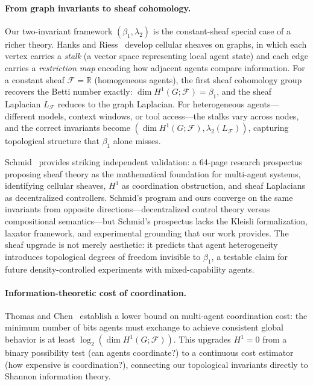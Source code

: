 \paragraph{From graph invariants to sheaf cohomology.}
Our two-invariant framework $(\beta_1, \lambda_2)$ is the
constant-sheaf special case of a richer theory.
Hanks and Riess~\cite{hanks2025cellular} develop cellular sheaves on
graphs, in which each vertex carries a \emph{stalk} (a vector space
representing local agent state) and each edge carries a
\emph{restriction map} encoding how adjacent agents compare information.
For a constant sheaf $\mathcal{F} = \mathbb{R}$ (homogeneous agents),
the first sheaf cohomology group recovers the Betti number exactly:
$\dim H^1(G;\mathcal{F}) = \beta_1$, and the sheaf Laplacian
$L_{\mathcal{F}}$ reduces to the graph Laplacian.
For heterogeneous agents---different models, context windows, or tool
access---the stalks vary across nodes, and the correct invariants
become $(\dim H^1(G;\mathcal{F}), \lambda_2(L_{\mathcal{F}}))$,
capturing topological structure that $\beta_1$ alone misses.

Schmid~\cite{schmid2026prospectus} provides striking independent
validation: a 64-page research prospectus proposing sheaf theory as the
mathematical foundation for multi-agent systems, identifying cellular
sheaves, $H^1$ as coordination obstruction, and sheaf Laplacians as
decentralized controllers.
Schmid's program and ours converge on the same invariants from opposite
directions---decentralized control theory versus compositional
semantics---but Schmid's prospectus lacks the Kleisli formalization,
laxator framework, and experimental grounding that our work provides.
The sheaf upgrade is not merely aesthetic: it predicts that agent
heterogeneity introduces topological degrees of freedom invisible to
$\beta_1$, a testable claim for future density-controlled experiments
with mixed-capability agents.



\paragraph{Information-theoretic cost of coordination.}
Thomas and Chen~\cite{thomas2026shannon} establish a lower bound on
multi-agent coordination cost: the minimum number of bits agents must
exchange to achieve consistent global behavior is at least
$\log_2(\dim H^1(G;\mathcal{F}))$.
This upgrades $H^1 = 0$ from a binary possibility test (can agents
coordinate?) to a continuous cost estimator (how expensive is
coordination?), connecting our topological invariants directly to
Shannon information theory.

